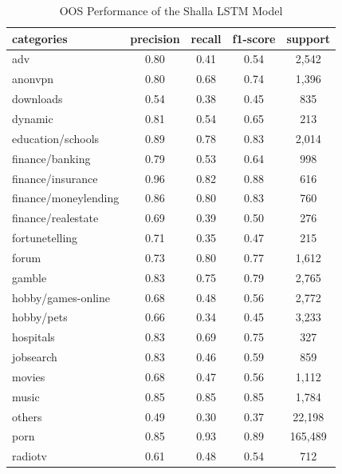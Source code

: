 \documentclass[12pt, letterpaper]{article}
\begin{document}
\begin{table}[!htb]
\centering
\tiny
\caption{OOS Performance of the Shalla LSTM Model}
\begin{tabular}{ l c c c c }
\hline
categories      & precision & recall & f1-score & support \\
\hline
                   adv   &     0.80  &    0.41  &    0.54   &   2,542 \\
               anonvpn   &     0.80  &    0.68  &    0.74   &   1,396 \\
             downloads   &     0.54  &    0.38  &    0.45   &    835 \\
               dynamic   &     0.81  &    0.54  &    0.65   &    213 \\
     education/schools   &     0.89  &    0.78  &    0.83   &   2,014 \\
       finance/banking   &     0.79  &    0.53  &    0.64   &    998 \\
     finance/insurance   &     0.96  &    0.82  &    0.88   &    616 \\
  finance/moneylending   &     0.86  &    0.80  &    0.83   &    760 \\
    finance/realestate   &     0.69  &    0.39  &    0.50   &    276 \\
        fortunetelling   &     0.71  &    0.35  &    0.47   &    215 \\
                 forum   &     0.73  &    0.80  &    0.77   &   1,612 \\
                gamble   &     0.83  &    0.75  &    0.79   &   2,765 \\
    hobby/games-online   &     0.68  &    0.48  &    0.56   &   2,772 \\
            hobby/pets   &     0.66  &    0.34  &    0.45   &   3,233 \\
             hospitals   &     0.83  &    0.69  &    0.75   &    327 \\
             jobsearch   &     0.83  &    0.46  &    0.59   &    859 \\
                movies   &     0.68  &    0.47  &    0.56   &   1,112 \\
                 music   &     0.85  &    0.85  &    0.85   &   1,784 \\
                others   &     0.49  &    0.30  &    0.37   &  22,198 \\
                  porn   &     0.85  &    0.93  &    0.89   & 165,489 \\
               radiotv   &     0.61  &    0.48  &    0.54   &    712 \\

\end{tabular}
\end{table}
\end{document}
